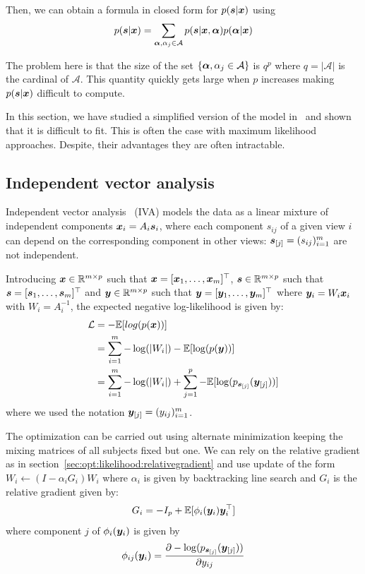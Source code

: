 Then, we can obtain a formula in closed form for $p(\sbb | \xb)$ using
\begin{align}
  p(\sbb | \xb) = \sum_{\alphab, \alpha_j \in \mathcal{A}} p(\sbb | \xb, \alphab) p(\alphab | \xb)
\end{align}

The problem here is that the size of the set $\{\alphab, \alpha_j \in
\mathcal{A} \}$ is $q^p$ where $q=|\mathcal{A}|$ is the cardinal of
$\mathcal{A}$. This quantity quickly gets large when $p$ increases making
$p(\sbb | \xb)$ difficult to compute.

In this section, we have studied a simplified version of the
model in~\cite{guo2008unified} and shown that it is difficult to fit. This is
often the case with maximum likelihood approaches. Despite, their advantages they
are often intractable.

\subsection{Independent vector analysis}
\label{sec:IVA}
Independent vector analysis~\cite{lee2008independent} (IVA) models the data as a
linear mixture of independent components $\xb_i = A_i \sbb_i$, where each
component $s_{ij}$ of a given view $i$ can depend on the corresponding component
in other views: $\sbb_{[j]} = (s_{ij})_{i=1}^m$ are not independent.

Introducing $\xb \in \RR^{m \times p}$ such that $\xb  = [\xb_1, \dots, \xb_m]^{\top}$,
$\sbb \in \RR^{m \times p}$ such that $\sbb = [\sbb_1, \dots, \sbb_m]^{\top}$ and $\yb
\in \RR^{m \times p}$ such that $\yb = [\yb_1, \dots, \yb_m]^{\top}$ where $\yb_i = W_i
\xb_i$ with $W_i = A_i^{-1}$, the
expected negative log-likelihood is given by:
\begin{align*}
  \loss &= - \EE[log(p(\xb))] \\
        &= \sum_{i=1}^m -\log(|W_i|) -\EE[\log(p(\yb))] \\
        &= \sum_{i=1}^m - \log(|W_i|) + \sum_{j=1}^p -\EE[\log(p_{\sbb_{[j]}}(\yb_{[j]}))]
\end{align*}
where we used the notation $\yb_{[j]} = (y_{ij})_{i=1}^m$.

The optimization can be carried out using alternate minimization keeping the
mixing matrices of all subjects fixed but one. We can rely on the relative
gradient as in section~\ref{sec:opt:likelihood:relativegradient} and use update
of the form $W_i \leftarrow (I - \alpha_i G_i) W_i$ where $\alpha_i$ is given by
backtracking line search and $G_i$ is the relative gradient given by:
\begin{align}
  G_i = -I_p + \EE[\phi_i(\yb_i) \yb_i^{\top}]
\end{align}
where component $j$ of $\phi_i(\yb_i)$ is given by
\begin{align}
  \phi_{ij}(\yb_i) = \partialfrac{y_{ij}}{-\log(p_{\sbb_{[j]}}(\yb_{[j]}))}
\end{align}

